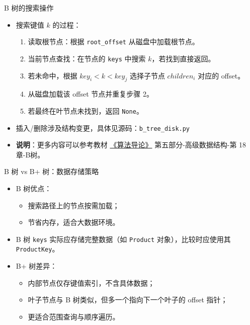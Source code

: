 \documentclass{beamer}
\begin{document}
\begin{frame}{B 树的搜索操作}
\begin{itemize}
  \item 搜索键值 $k$ 的过程：
  \begin{enumerate}
    \item 读取根节点：根据 \texttt{root\_offset} 从磁盘中加载根节点。
    \item 当前节点查找：在节点的 \texttt{keys} 中搜索 $k$，若找到直接返回。
    \item 若未命中，根据 $key_i < k < key_j$ 选择子节点 $children_i$ 对应的 offset。
    \item 从磁盘加载该 offset 节点并重复步骤 2。
    \item 若最终在叶节点未找到，返回 \texttt{None}。
  \end{enumerate}
  \item 插入/删除涉及结构变更，具体见源码：\texttt{b\_tree\_disk.py}
  \item \textbf{说明}：更多内容可以参考教材 \href{https://book.douban.com/subject/1152912/}{《算法导论》} 第五部分-高级数据结构-第 18 章-B树。
\end{itemize}
\end{frame}

\begin{frame}{B 树 vs B+ 树：数据存储策略}
\begin{itemize}
  \item B 树优点：
  \begin{itemize}
    \item 搜索路径上的节点按需加载；
    \item 节省内存，适合大数据环境。
  \end{itemize}
  \item B 树 \texttt{keys} 实际应存储完整数据（如 \texttt{Product} 对象），比较时应使用其 \texttt{ProductKey}。
  \item B+ 树差异：
  \begin{itemize}
    \item 内部节点仅存键值索引，不含具体数据；
    \item 叶子节点与 B 树类似，但多一个指向下一个叶子的 offset 指针；
    \item 更适合范围查询与顺序遍历。
  \end{itemize}
\end{itemize}
\end{frame}
\end{document}
